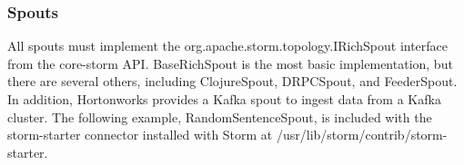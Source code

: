 \documentclass{hcmutarticle}
\begin{document}

\subsubsection{Spouts\\}
All spouts must implement the org.apache.storm.topology.IRichSpout interface
from the core-storm API. BaseRichSpout is the most basic implementation, but there are
several others, including ClojureSpout, DRPCSpout, and FeederSpout. In addition,
Hortonworks provides a Kafka spout to ingest data from a Kafka cluster. The following
example, RandomSentenceSpout, is included with the storm-starter connector
installed with Storm at /usr/lib/storm/contrib/storm-starter.
\end{document}

